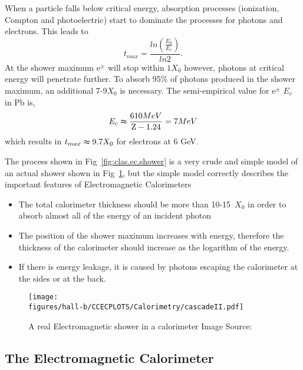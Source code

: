 When a particle falls below critical energy, absorption processes (ionization, Compton and photoelectric) start to dominate the processes for photons and electrons. This leads to
\begin{equation}
t_{max} = \frac{ln(\frac{E_{0}}{E_{c}})}{ln2}.
\end{equation}
At the shower maximum $\mathrm{e^{\pm}}$ will stop within $1X_{0}$ however, photons at critical energy will penetrate further. To absorb 95\% of photons produced in the shower maximum, an additional 7-9$X_{0}$ is necessary. The semi-empirical value for $\mathrm{e^{\pm}}$ $E_c$ in Pb is,
\begin{equation}
E_{c}  \thickapprox \frac{610 MeV}{\mathrm{Z} - 1.24} = 7 MeV 
\end{equation}
which results in $t_{max} \thickapprox 9.7 X_{0}$ for electrons at 6 GeV.

The process shown in Fig~\ref{fig:clas.ec.shower} is a very crude and simple model of an actual shower shown in Fig~\ref{fig:clas.ec.showerII}, but the simple model correctly describes the important features of Electromagnetic Calorimeters
\begin{itemize}
\item The total calorimeter thickness should be more than 10-15~$X_0$ in order to absorb almost all of the energy of an incident photon
\item The position of the shower maximum increases with energy, therefore the thickness of the calorimeter should increase as the logarithm of the energy.
\item If there is energy leakage, it is caused by photons escaping the calorimeter at the sides or at the back.
\end{itemize}

 
\begin{figure}[h!]\begin{center}
\texttt{[image: \\figures/hall-b/CCECPLOTS/Calorimetry/cascadeII.pdf]}
\caption[A real Electromagnetic shower in a calorimeter]{\label{fig:clas.ec.showerII}{A real Electromagnetic shower in a calorimeter} Image Source:~\cite{vibe_levels} }
\end{center}\end{figure}

\subsection{The  Electromagnetic Calorimeter}

